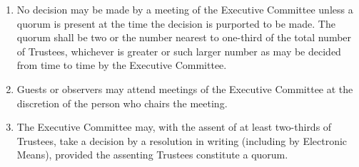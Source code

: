 \documentclass[11pt,a4paper, oneside]{memoir}
\begin{document}
\begin{enumerate}
		\item No decision may be made by a meeting of the Executive Committee unless a quorum is present at the time the decision is purported to be made.
		The quorum shall be two or the number nearest to one-third of the total number of Trustees, whichever is greater or such larger number as may be decided from time to time by the Executive Committee.
		\item Guests or observers may attend meetings of the Executive Committee at the discretion of the person who chairs the meeting.
		\item The Executive Committee may, with the assent of at least two-thirds of Trustees, take a decision by a resolution in writing (including by Electronic Means), provided the assenting Trustees constitute a quorum.
	\end{enumerate}
\end{document}
